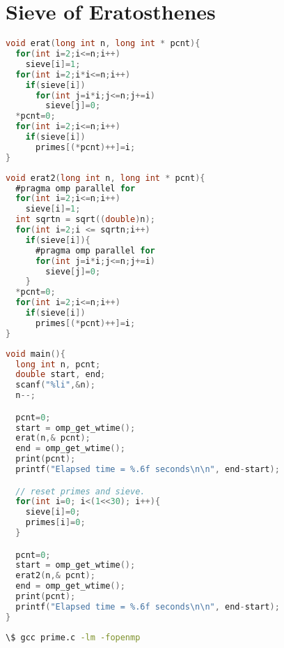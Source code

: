 \documentclass[12pt]{article}
\begin{document}
\section*{Sieve of Eratosthenes}
\begin{lstlisting}[frame=single,language=C,caption=Non-parallelized Sieve of Eratosthenes (prime.c) \label{code:prime-sieve-nonparallelized}]
void erat(long int n, long int * pcnt){
  for(int i=2;i<=n;i++)
    sieve[i]=1;
  for(int i=2;i*i<=n;i++)
    if(sieve[i])
      for(int j=i*i;j<=n;j+=i)
        sieve[j]=0;
  *pcnt=0;
  for(int i=2;i<=n;i++)
    if(sieve[i])
      primes[(*pcnt)++]=i; 
}
\end{lstlisting}
\begin{lstlisting}[frame=single,language=C,caption=Parllelized Sieve of Eratosthenes (prime.c) \label{code:prime-sieve-parallelized}]
void erat2(long int n, long int * pcnt){
  #pragma omp parallel for
  for(int i=2;i<=n;i++)
    sieve[i]=1;
  int sqrtn = sqrt((double)n);
  for(int i=2;i <= sqrtn;i++)
    if(sieve[i]){
      #pragma omp parallel for
      for(int j=i*i;j<=n;j+=i)
        sieve[j]=0;
    }
  *pcnt=0;
  for(int i=2;i<=n;i++)
    if(sieve[i])
      primes[(*pcnt)++]=i; 
}
\end{lstlisting}
\newpage
\begin{lstlisting}[frame=single,language=C,caption=Measuring Runtime Performance (prime.c) \label{code:prime-sieve-runtime}]
void main(){
  long int n, pcnt;
  double start, end;
  scanf("%li",&n);
  n--;

  pcnt=0;
  start = omp_get_wtime();
  erat(n,& pcnt);
  end = omp_get_wtime();
  print(pcnt);
  printf("Elapsed time = %.6f seconds\n\n", end-start);

  // reset primes and sieve.
  for(int i=0; i<(1<<30); i++){
    sieve[i]=0;
    primes[i]=0;
  }

  pcnt=0;
  start = omp_get_wtime();
  erat2(n,& pcnt);
  end = omp_get_wtime();
  print(pcnt);
  printf("Elapsed time = %.6f seconds\n\n", end-start);
}
\end{lstlisting}
\begin{lstlisting}[frame=single,language=Bash,caption=Output in Terminal from prime sieve program (prime.c) \label{code:prime-sieve-terminal-output}]
\$ gcc prime.c -lm -fopenmp
\end{lstlisting}
\newpage
\end{document}
